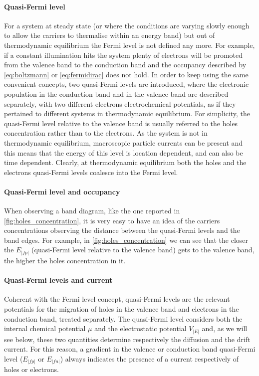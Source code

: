 		\paragraph{Quasi-Fermi level}
		For a system at steady state (or where the conditions are varying slowly enough to allow the carriers to thermalise within an energy band) but out of thermodynamic equilibrium the Fermi level is not defined any more.
		For example, if a constant illumination hits the system plenty of electrons will be promoted from the valence band to the conduction band and the occupancy described by \cref{eq:boltzmann} or \cref{eq:fermidirac} does not hold.
		In order to keep using the same convenient concepts, two quasi\hyp{}Fermi levels are introduced, where the electronic population in the conduction band and in the valence band are described separately, with two different electrons electrochemical potentials, as if they pertained to different systems in thermodynamic equilibrium.
		For simplicity, the quasi-Fermi level relative to the valence band is usually referred to the holes concentration rather than to the electrons.
		As the system is not in thermodynamic equilibrium, macroscopic particle currents can be present and this means that the energy of this level is location dependent, and can also be time dependent.
		Clearly, at thermodynamic equilibrium both the holes and the electrons quasi\hyp{}Fermi levels coalesce into the Fermi level.
		
		\paragraph{Quasi-Fermi level and occupancy}
		When observing a band diagram, like the one reported in \cref{fig:holes_concentration}, it is very easy to have an idea of the carriers concentrations observing the distance between the quasi\hyp{}Fermi levels and the band edges.
		For example, in \cref{fig:holes_concentration} we can see that the closer the $E_|fp|$ (quasi\hyp{}Fermi level relative to the valence band) gets to the valence band, the higher the holes concentration in it.
		
		\paragraph{Quasi\hyp{}Fermi levels and current}
		Coherent with the Fermi level concept, quasi-Fermi levels are the relevant potentials for the migration of holes in the valence band and electrons in the conduction band, treated separately.
		The quasi\hyp{}Fermi level considers both the internal chemical potential $\mu$ and the electrostatic potential $V_|E|$ and, as we will see below, these two quantities determine respectively the diffusion and the drift current.
		For this reason, a gradient in the valence or conduction band quasi\hyp{}Fermi level ($E_|fp|$ or $E_|fn|$) always indicates the presence of a current respectively of holes or electrons.
		
